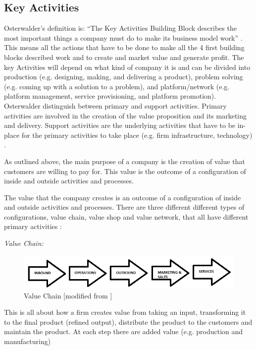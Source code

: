 \subsection{Key Activities}
Osterwalder’s definition is: “The Key Activities Building Block describes the most important things a company must do to make its business model work” \cite{osterwalder}. This means all the actions that have to be done to make all the 4 first building blocks described work and to create and market value and generate profit. The key Activities will depend on what kind of company it is and can be divided into production (e.g. designing, making, and delivering a product), problem solving (e.g. coming up with a solution to a problem), and platform/network (e.g. platform management, service provisioning, and platform promotion). 
Osterwalder distinguish between primary and support activities. Primary activities are involved in the creation of the value proposition and its marketing and delivery. Support activities are the underlying activities that have to be in-place for the primary activities to take place (e.g. firm infrastructure, technology) \cite{osterwalderthesis}.

As outlined above, the main purpose of a company is the creation of value that customers are willing to pay for. This value is the outcome of a configuration of inside and outside activities and
processes.

The value that the company creates is an outcome of a configuration of inside and outside activities and processes. There are three different different types of configurations, value chain, value shop and value network, that all have different primary activities \cite{osterwalderthesis}:

\newpage

\emph{Value Chain:} 

\begin{figure}[h]
\caption[ValueChain]{Value Chain [modified from \cite{osterwalderthesis}]}
\label{fig:ValueChain}
\begin{center}
\includegraphics[scale=0.8]{valuechain}
\end{center}
\end{figure}


This is all about how a firm creates value from taking an input, transforming it to the final product (refined output), distribute the product  to the customers and maintain the product. At each step there are added value (e.g. production and manufacturing)

